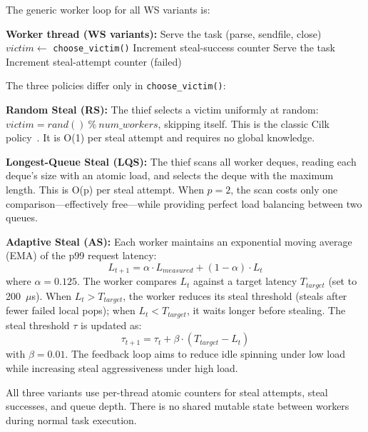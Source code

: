 \documentclass[conference]{IEEEtran}
\begin{document}
The generic worker loop for all WS variants is:

\begin{algorithmic}
\STATE \textbf{Worker thread (WS variants):}
\LOOP
        \STATE Serve the task (parse, sendfile, close)
    \ELSE
        \STATE $victim \gets$ \texttt{choose\_victim()}
            \STATE Increment steal-success counter
            \STATE Serve the task
        \ELSE
            \STATE Increment steal-attempt counter (failed)
        \ENDIF
    \ENDIF
\ENDLOOP
\end{algorithmic}

The three policies differ only in \texttt{choose\_victim()}:

\textbf{Random Steal (RS):} The thief selects a victim uniformly at random: $victim = rand()\ \%\ num\_workers$, skipping itself. This is the classic Cilk policy~\cite{b1}. It is O(1) per steal attempt and requires no global knowledge.

\textbf{Longest-Queue Steal (LQS):} The thief scans all worker deques, reading each deque's size with an atomic load, and selects the deque with the maximum length. This is O(p) per steal attempt. When $p=2$, the scan costs only one comparison---effectively free---while providing perfect load balancing between two queues.

\textbf{Adaptive Steal (AS):} Each worker maintains an exponential moving average (EMA) of the p99 request latency:
\begin{equation}
L_{t+1} = \alpha \cdot L_{measured} + (1-\alpha) \cdot L_t
\label{eq:ema}
\end{equation}
where $\alpha = 0.125$. The worker compares $L_t$ against a target latency $T_{target}$ (set to 200~$\mu$s). When $L_t > T_{target}$, the worker reduces its steal threshold (steals after fewer failed local pops); when $L_t < T_{target}$, it waits longer before stealing. The steal threshold $\tau$ is updated as:
\begin{equation}
\tau_{t+1} = \tau_t + \beta \cdot (T_{target} - L_t)
\label{eq:tau}
\end{equation}
with $\beta = 0.01$. The feedback loop aims to reduce idle spinning under low load while increasing steal aggressiveness under high load.

All three variants use per-thread atomic counters for steal attempts, steal successes, and queue depth. There is no shared mutable state between workers during normal task execution.
\end{document}
